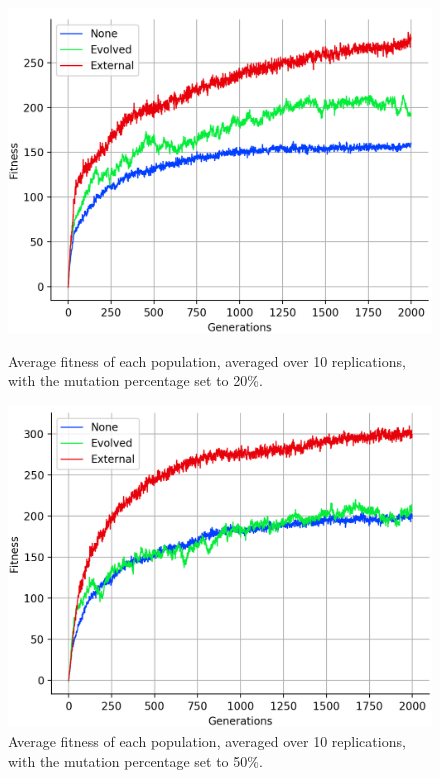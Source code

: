 \documentclass[12pt,a4paper]{report}
\begin{document}
\begin{figure}[ht]
   \centering
   \begin{minipage}{0.49\textwidth}
          \centering
          \captionsetup{width=.9\linewidth}
          \includegraphics[width=1.\linewidth]{results/average-mut20.png}
          \caption{Average fitness of each population, averaged over 10 replications, with the mutation percentage set to 20\%.}
          \label{fig:average-mut20}
   \end{minipage}
   \begin{minipage}{0.49\textwidth}
          \centering
          \captionsetup{width=.9\linewidth}
          \includegraphics[width=1.\linewidth]{results/average-mut50.png}
          \caption{Average fitness of each population, averaged over 10 replications, with the mutation percentage set to 50\%.}
          \label{fig:average-mut50}
   \end{minipage}
\end{figure}
\end{document}

